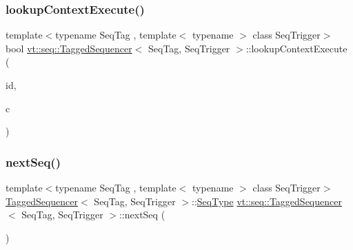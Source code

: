 \subsubsection{\texorpdfstring{lookup\+Context\+Execute()}{lookupContextExecute()}}
{\footnotesize\ttfamily template$<$typename Seq\+Tag , template$<$ typename $>$ class Seq\+Trigger$>$ \\
bool \hyperlink{structvt_1_1seq_1_1_tagged_sequencer}{vt\+::seq\+::\+Tagged\+Sequencer}$<$ Seq\+Tag, Seq\+Trigger $>$\+::lookup\+Context\+Execute (\begin{DoxyParamCaption}\item[{\hyperlink{structvt_1_1seq_1_1_tagged_sequencer_a1c8ee839258d0f88c49ef660267a81d5}{Seq\+Type} const \&}]{id,  }\item[{\hyperlink{structvt_1_1seq_1_1_tagged_sequencer_ad8a1ed9b8c012cf2a73ebd2e46d6d899}{Seq\+Ctx\+Function\+Type}}]{c }\end{DoxyParamCaption})}

\mbox{\label{structvt_1_1seq_1_1_tagged_sequencer_af7a02a262d3da7958b24b7d7997df9f1}} 
\subsubsection{\texorpdfstring{next\+Seq()}{nextSeq()}}
{\footnotesize\ttfamily template$<$typename Seq\+Tag , template$<$ typename $>$ class Seq\+Trigger$>$ \\
\hyperlink{structvt_1_1seq_1_1_tagged_sequencer}{Tagged\+Sequencer}$<$ Seq\+Tag, Seq\+Trigger $>$\+::\hyperlink{structvt_1_1seq_1_1_tagged_sequencer_a1c8ee839258d0f88c49ef660267a81d5}{Seq\+Type} \hyperlink{structvt_1_1seq_1_1_tagged_sequencer}{vt\+::seq\+::\+Tagged\+Sequencer}$<$ Seq\+Tag, Seq\+Trigger $>$\+::next\+Seq (\begin{DoxyParamCaption}{ }\end{DoxyParamCaption})}

\mbox{\label{structvt_1_1seq_1_1_tagged_sequencer_a3742a3c79eb8cd4cb92e7beb9d04c0bb}} 
